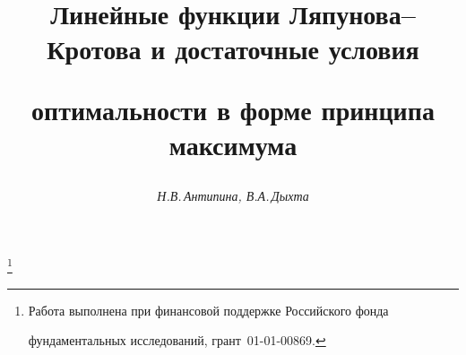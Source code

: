









\newcommand{\PR}{\operatorname{pr}}


\newcommand{\co}{\operatorname{co}}


\newcommand{\con}{\operatorname{con}}


\newcommand{\const}{\operatorname{const}}


\newcommand{\dom}{\operatorname{dom}}


\newcommand{\tts}[1]{}







\setcounter{page}{11}















\author{\it Н.В.\,Антипина, В.А.\,Дыхта}




\title{Линейные функции Ляпунова--Кротова и достаточные условия


оптимальности в форме принципа максимума}


\thanks{Работа выполнена при финансовой поддержке Российского фонда


фундаментальных исследований, грант \No\,01-01-00869.}





\date{}




